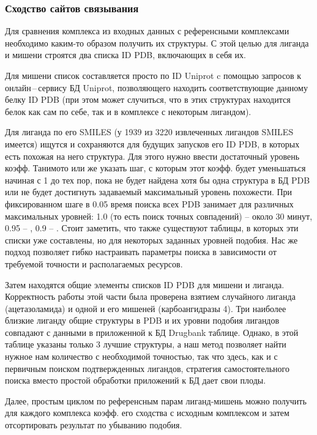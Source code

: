 \documentclass[a4paper,14pt]{article}         %
\newcommand{\sic}[1]{\LARGE\color{orange}{#1}\color{black}\Large}
\begin{document}
\subsubsection{Сходство сайтов связывания}
Для сравнения комплекса из входных данных с референсными комплексами необходимо каким-то образом получить их структуры. С этой целью для лиганда и мишени строятся два списка ID PDB, включающих в себя их. 

Для мишени список составляется просто по ID Uniprot c помощью запросов к онлайн\,--\,сервису БД Uniprot, позволяющего находить соответствующие данному белку ID PDB (при этом может случиться, что в этих структурах находится белок как сам по себе, так и в комплексе с некоторым лигандом). 

Для лиганда по его SMILES (у 1939 из 3220 извлеченных лигандов SMILES имеется) ищутся и сохраняются для будущих запусков его ID PDB, в которых есть похожая на него структура. Для этого нужно ввести достаточный уровень коэфф. Танимото или же указать шаг, с которым этот коэфф. будет уменьшаться начиная с 1 до тех пор, пока не будет найдена хотя бы одна структура в БД PDB или не будет достигнуть задаваемый максимальный уровень похожести. При фиксированном шаге в 0.05 время поиска всех PDB занимает для различных максимальных уровней: 1.0 (то есть поиск точных совпадений) -- около 30 минут, 0.95 -- , 0.9 -- . \sic{Добавить результаты} Стоит заметить, что также существуют таблицы, в которых эти списки уже составлены, но для некоторых заданных уровней подобия. Нас же подход позволяет гибко настраивать параметры поиска в зависимости от требуемой точности и располагаемых ресурсов.

Затем находятся общие элементы списков ID PDB для мишени и лиганда. Корректность работы этой части была проверена взятием случайного лиганда (ацетазоламида) и одной и его мишеней (карбоангидразы 4). Три наиболее близкие лиганду общие структуры в PDB и их уровни подобия лигандов совпадают с данными в приложенной к БД Drugbank таблице. Однако, в этой таблице указаны только 3 лучшие структуры, а наш метод позволяет найти нужное нам количество с необходимой точностью, так что здесь, как и с первичным поиском подтвержденных лигандов, стратегия самостоятельного поиска вместо простой обработки приложений к БД дает свои плоды.

Далее, простым циклом по референсным парам лиганд-мишень можно получить для каждого комплекса коэфф. его сходства с исходным комплексом и затем отсортировать результат по убыванию подобия.
\end{document}
